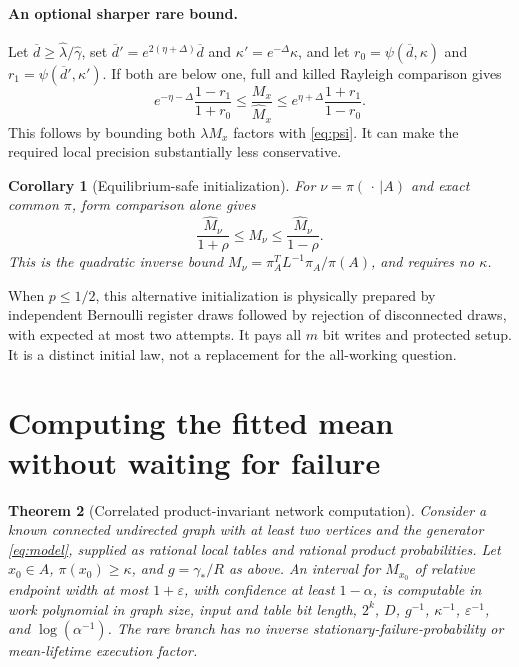 \documentclass[10pt,a4paper]{article}
\newtheorem{theorem}{Theorem}[section]
\newtheorem{corollary}[theorem]{Corollary}
\theoremstyle{definition}\newtheorem{assumption}[theorem]{Assumption}
\newcommand{\eps}{\varepsilon}
\begin{document}
\paragraph{An optional sharper rare bound.}
Let $\overline d\ge\widehat\lambda/\widehat\gamma$, set
$\overline d' =e^{2(\eta+\Delta)}\overline d$ and $\kappa'=e^{-\Delta}\kappa$, and let
$r_0=\psi(\overline d,\kappa)$ and $r_1=\psi(\overline d',\kappa')$.
If both are below one, full and killed Rayleigh comparison gives
\begin{equation}
 e^{-\eta-\Delta}\frac{1-r_1}{1+r_0}
 \le\frac{M_x}{\widehat M_x}\le
 e^{\eta+\Delta}\frac{1+r_1}{1-r_0}.
 \label{eq:rareenergy}
\end{equation}
This follows by bounding both $\lambda M_x$ factors with \eqref{eq:psi}. It can make the required local precision substantially less conservative.

\begin{corollary}[Equilibrium-safe initialization]
\label{cor:eqsafe}
For $\nu=\pi(\,\cdot\,|A)$ and exact common $\pi$, form comparison alone gives
\[
 \frac{\widehat M_\nu}{1+\rho}\le M_\nu
 \le\frac{\widehat M_\nu}{1-\rho}.
\]
This is the quadratic inverse bound
$M_\nu=\pi_A^TL^{-1}\pi_A/\pi(A)$, and requires no $\kappa$.
\end{corollary}

When $p\le1/2$, this alternative initialization is physically prepared by independent Bernoulli register draws followed by rejection of disconnected draws, with expected at most two attempts. It pays all $m$ bit writes and protected setup. It is a distinct initial law, not a replacement for the all-working question.

\section{Computing the fitted mean without waiting for failure}
\label{sec:computation}

\begin{theorem}[Correlated product-invariant network computation]
\label{thm:compute}
Consider a known connected undirected graph with at least two vertices and the generator \eqref{eq:model}, supplied as rational local tables and rational product probabilities. Let $x_0\in A$, $\pi(x_0)\ge\kappa$, and $g=\gamma_*/R$ as above. An interval for $M_{x_0}$ of relative endpoint width at most $1+\eps$, with confidence at least $1-\alpha$, is computable in work polynomial in graph size, input and table bit length, $2^k$, $D$, $g^{-1}$, $\kappa^{-1}$, $\eps^{-1}$, and $\log(\alpha^{-1})$. The rare branch has no inverse stationary-failure-probability or mean-lifetime execution factor.
\end{theorem}
\end{document}
